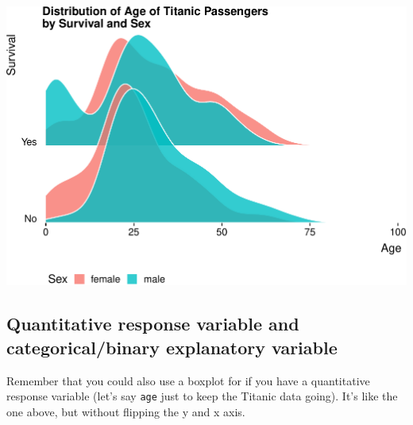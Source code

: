 \documentclass[]{article}
\newenvironment{Shaded}{\begin{snugshade}}{\end{snugshade}}
\newcommand{\CharTok}[1]{\textcolor[rgb]{0.31,0.60,0.02}{#1}}
\newcommand{\DataTypeTok}[1]{\textcolor[rgb]{0.13,0.29,0.53}{#1}}
\newcommand{\DecValTok}[1]{\textcolor[rgb]{0.00,0.00,0.81}{#1}}
\newcommand{\FloatTok}[1]{\textcolor[rgb]{0.00,0.00,0.81}{#1}}
\newcommand{\KeywordTok}[1]{\textcolor[rgb]{0.13,0.29,0.53}{\textbf{#1}}}
\newcommand{\NormalTok}[1]{#1}
\newcommand{\OperatorTok}[1]{\textcolor[rgb]{0.81,0.36,0.00}{\textbf{#1}}}
\newcommand{\StringTok}[1]{\textcolor[rgb]{0.31,0.60,0.02}{#1}}
\begin{document}
\includegraphics{Visualization_Examples_2020_v01_files/figure-latex/unnamed-chunk-3-1.pdf}

\hypertarget{quantitative-response-variable-and-categoricalbinary-explanatory-variable}{%
\subsection{Quantitative response variable and categorical/binary
explanatory
variable}\label{quantitative-response-variable-and-categoricalbinary-explanatory-variable}}

Remember that you could also use a boxplot for if you have a
quantitative response variable (let's say \texttt{age} just to keep the
Titanic data going). It's like the one above, but without flipping the y
and x axis.

\begin{Shaded}
\end{Shaded}
\end{document}
